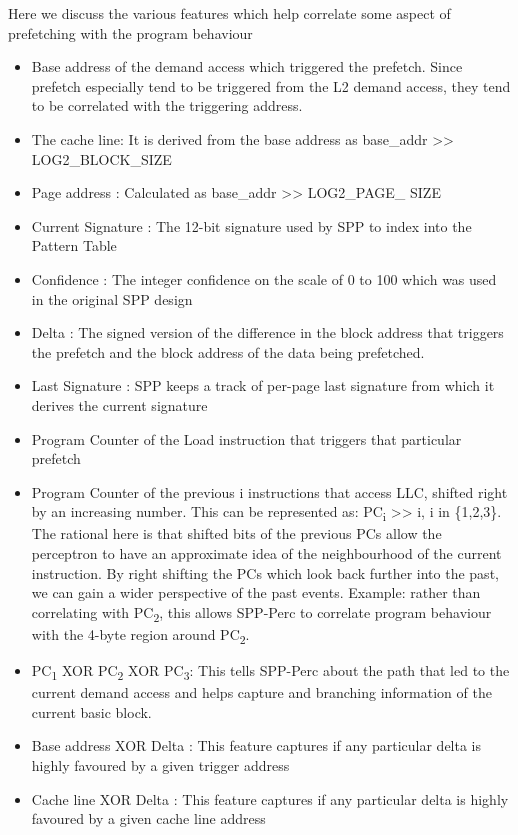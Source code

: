 \documentclass{sig-alternate}
\begin{document}
Here we discuss the various features which help correlate some aspect of prefetching with the program behaviour
\begin{itemize}
\item Base address of the demand access which triggered the prefetch. Since prefetch especially tend to be triggered from the L2 demand access, they tend to be correlated with the triggering address.
\item The cache line: It is derived from the base address as base\_addr >> LOG2\_BLOCK\_SIZE
\item Page address : Calculated as base\_addr >> LOG2\_PAGE\_ SIZE
\item Current Signature : The 12-bit signature used by SPP to index into the Pattern Table
\item Confidence : The integer confidence on the scale of 0 to 100 which was used in the original SPP design
\item Delta : The signed version of the difference in the block address that triggers the prefetch and the block address of the data being prefetched.
\item Last Signature : SPP keeps a track of per-page last signature from which it derives the current signature
\item Program Counter of the Load instruction that triggers that particular prefetch
\item Program Counter of the previous i instructions that access LLC, shifted right by an increasing number. This can be represented as: PC\textsubscript{i} >> i, i in \{1,2,3\}. The rational here is that shifted bits of the previous PCs allow the perceptron to have an approximate idea of the neighbourhood of the current instruction. By right shifting the PCs which look back further into the past, we can gain a wider perspective of the past events. Example: rather than correlating with PC\textsubscript{2}, this allows SPP-Perc to correlate program behaviour with the 4-byte region around PC\textsubscript{2}.
\item PC\textsubscript{1} XOR PC\textsubscript{2} XOR PC\textsubscript{3}: This tells SPP-Perc about the path that led to the current demand access and helps capture and branching information of the current basic block.
\item Base address XOR Delta : This feature captures if any particular delta is highly favoured by a given trigger address
\item Cache line XOR Delta : This feature captures if any particular delta is highly favoured by a given cache line address

\end{itemize}
\end{document}
